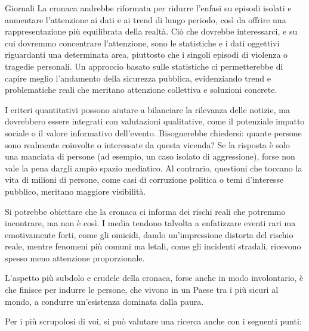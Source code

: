 \documentclass[12pt]{book} %
\begin{document}
\begin{mdframed}[linewidth=1pt]
Giornali
La cronaca andrebbe riformata per ridurre l’enfasi su episodi isolati e aumentare l’attenzione ai dati e ai trend di lungo periodo, così da offrire una rappresentazione più equilibrata della realtà. Ciò che dovrebbe interessarci, e su cui dovremmo concentrare l'attenzione, sono le statistiche e i dati oggettivi riguardanti una determinata area, piuttosto che i singoli episodi di violenza o tragedie personali. Un approccio basato sulle statistiche ci permetterebbe di capire meglio l'andamento della sicurezza pubblica, evidenziando trend e problematiche reali che meritano attenzione collettiva e soluzioni concrete.

I criteri quantitativi possono aiutare a bilanciare la rilevanza delle notizie, ma dovrebbero essere integrati con valutazioni qualitative, come il potenziale impatto sociale o il valore informativo dell’evento. Bisognerebbe chiedersi: quante persone sono realmente coinvolte o interessate da questa vicenda? Se la risposta è solo una manciata di persone (ad esempio, un caso isolato di aggressione), forse non vale la pena dargli ampio spazio mediatico. Al contrario, questioni che toccano la vita di milioni di persone, come casi di corruzione politica o temi d'interesse pubblico, meritano maggiore visibilità.

Si potrebbe obiettare che la cronaca ci informa dei rischi reali che potremmo incontrare, ma non è così. I media tendono talvolta a enfatizzare eventi rari ma emotivamente forti, come gli omicidi, dando un’impressione distorta del rischio reale, mentre fenomeni più comuni ma letali, come gli incidenti stradali, ricevono spesso meno attenzione proporzionale.

L’aspetto più subdolo e crudele della cronaca, forse anche in modo involontario, è che finisce per indurre le persone, che vivono in un Paese tra i più sicuri al mondo, a condurre un’esistenza dominata dalla paura.
\end{mdframed}

\bigskip

Per i più scrupolosi di voi, si può valutare una ricerca anche con i seguenti punti:


\bigskip
\end{document}
